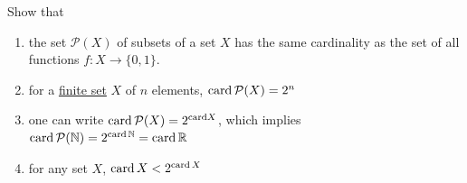   \begin{exercise}[Zorich 2.4.5]
    Show that 
    \begin{enumerate}
      \item the set $\mathcal{P}(X)$ of subsets of a set $X$ has the same cardinality as the set of all functions $f: X \to \{0, 1\}$. 
      \item for a \hyperref[st-def:finite-set]{finite set} $X$ of $n$ elements, $\operatorname*{card}{\mathcal{P}(X)} = 2^n$ 
      \item one can write $\operatorname*{card}{\mathcal{P}(X)} = 2^{\text{card}{X}}$, which implies $\text{card}\, \mathcal{P}(\mathbb{N}) = 2^{\operatorname*{card} \mathbb{N}} = \operatorname*{card} \mathbb{R}$ 
      \item for any set $X$, $\operatorname*{card}{X} < 2^{\operatorname*{card}{X}}$
    \end{enumerate}
  \end{exercise}
